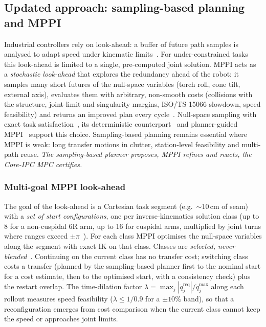 \subsection{Updated approach: sampling-based planning and MPPI}
Industrial controllers rely on look-ahead: a buffer of future path samples is analysed to adapt speed under kinematic limits~\cite{lange2016pathaccurate}. For under-constrained tasks this look-ahead is limited to a single, pre-computed joint solution. MPPI acts as a \emph{stochastic look-ahead} that explores the redundancy ahead of the robot: it samples many short futures of the null-space variables (torch roll, cone tilt, external axis), evaluates them with arbitrary, non-smooth costs (collisions with the structure, joint-limit and singularity margins, ISO/TS 15066 slowdown, speed feasibility) and returns an improved plan every cycle~\cite{williams2018tro}. Null-space sampling with exact task satisfaction~\cite{wang2024constrainedpi,lee2026prmppi}, its deterministic counterpart~\cite{sun2024nullspacempc} and planner-guided MPPI~\cite{tao2023rrtmppi,trevisan2024biasedmppi} support this choice. Sampling-based planning remains essential where MPPI is weak: long transfer motions in clutter, station-level feasibility and multi-path reuse. \emph{The sampling-based planner proposes, MPPI refines and reacts, the Core-IPC MPC certifies.}

\subsubsection{Multi-goal MPPI look-ahead}
The goal of the look-ahead is a Cartesian task segment (e.g.\ ${\sim}10$\,cm of seam) with a \emph{set of start configurations}, one per inverse-kinematics solution class (up to 8 for a non-cuspidal 6R arm, up to 16 for cuspidal arms, multiplied by joint turns where ranges exceed $\pm\pi$~\cite{elias2025cuspidal}). For each class MPPI optimises the null-space variables along the segment with exact IK on that class. Classes are \emph{selected, never blended}~\cite{liu2026clusteringmppi,wang2026mppiem}. Continuing on the current class has no transfer cost; switching class costs a transfer (planned by the sampling-based planner first to the nominal start for a cost estimate, then to the optimised start, with a consistency check) plus the restart overlap. The time-dilation factor $\lambda=\max_j |\dot q_j^{\mathrm{req}}|/\dot q_j^{\max}$ along each rollout measures speed feasibility ($\lambda\le 1/0.9$ for a $\pm10\%$ band), so that a reconfiguration emerges from cost comparison when the current class cannot keep the speed or approaches joint limits.

